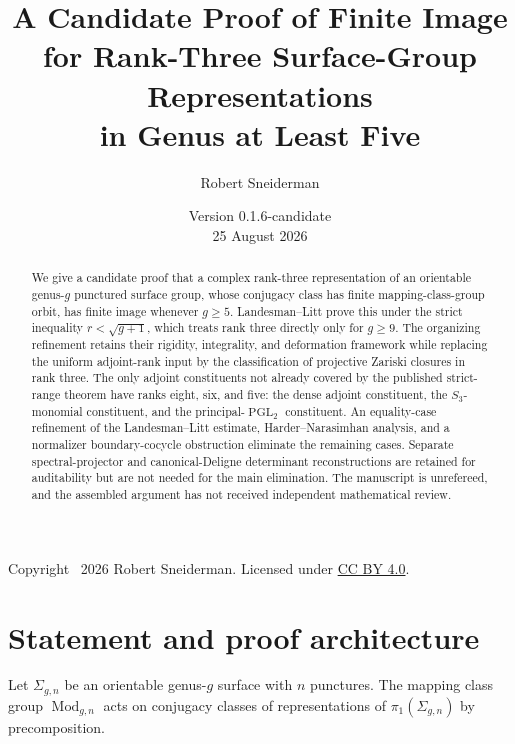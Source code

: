 \documentclass[11pt]{article}
\title{A Candidate Proof of Finite Image\\
for Rank-Three Surface-Group Representations\\
in Genus at Least Five}
\author{Robert Sneiderman}
\date{Version 0.1.6-candidate\\25 August 2026}
\theoremstyle{definition}
\newcommand{\Mod}{\operatorname{Mod}}
\newcommand{\PGL}{\operatorname{PGL}}
\begin{document}
\maketitle

\begin{abstract}
We give a candidate proof that a complex rank-three representation of an
orientable genus-$g$ punctured surface group, whose conjugacy class has
finite mapping-class-group orbit, has finite image whenever $g\ge5$.
Landesman--Litt prove this under the strict inequality
$r<\sqrt{g+1}$, which treats rank three directly only for $g\ge9$.
The organizing refinement retains their rigidity, integrality, and
deformation framework while replacing the uniform adjoint-rank input by the
classification of projective Zariski closures in rank three.  The only
adjoint constituents not already covered by the published strict-range
theorem have ranks eight, six, and five: the dense adjoint constituent, the
$S_3$-monomial constituent, and the principal-$\PGL_2$ constituent.  An
equality-case refinement of the Landesman--Litt estimate,
Harder--Narasimhan analysis, and a normalizer boundary-cocycle obstruction
eliminate the remaining cases.  Separate
spectral-projector and canonical-Deligne determinant reconstructions are
retained for auditability but are not needed for the main elimination.  The
manuscript is unrefereed, and the assembled argument has not received
independent mathematical review.
\end{abstract}

\begin{center}
\end{center}

\begin{center}
\small Copyright \textcopyright\ 2026 Robert Sneiderman.  Licensed under
\href{https://creativecommons.org/licenses/by/4.0/}{CC BY 4.0}.
\end{center}

\tableofcontents

\section{Statement and proof architecture}

Let $\Sigma_{g,n}$ be an orientable genus-$g$ surface with $n$ punctures.
The mapping class group $\Mod_{g,n}$ acts on conjugacy classes of
representations of $\pi_1(\Sigma_{g,n})$ by precomposition.
\end{document}
